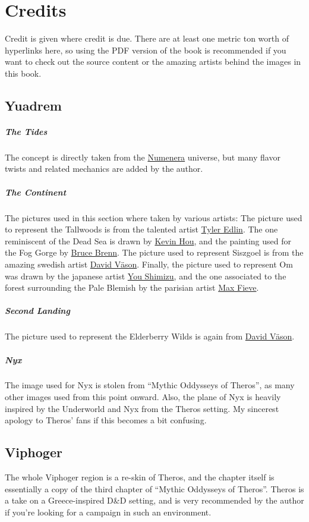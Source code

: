 \section{Credits}

Credit is given where credit is due.
There are at least one metric ton worth of hyperlinks here, so using the PDF version of the book is recommended if you want to check out the source content or the amazing artists behind the images in this book.

\subsection*{Yuadrem}
    \subparagraph{The Tides} The concept is directly taken from the \href{http://numenera.com/}{Numenera} universe, but many flavor twists and related mechanics are added by the author.

    \subparagraph{The Continent} The pictures used in this section where taken by various artists:
    The picture used to represent the Tallwoods is from the talented artist \href{https://www.artstation.com/tyleredlinart}{Tyler Edlin}.
    The one reminiscent of the Dead Sea is drawn by \href{https://www.artstation.com/knightblur}{Kevin Hou}, and the painting used for the Fog Gorge by \href{https://www.artstation.com/brucebrenn}{Bruce Brenn}.
    The picture used to represent Siszgoel is from the amazing swedish artist \href{https://www.artstation.com/davidvason}{David V\"ason}.
    Finally, the picture used to represent Om was drawn by the japanese artist \href{https://www.pixiv.net/en/users/2830609}{You Shimizu}, and the one associated to the forest surrounding the Pale Blemish by the parisian artist \href{https://www.artstation.com/maxfieve}{Max Fieve}.

    \subparagraph{Second Landing} The picture used to represent the Elderberry Wilds is again from \href{https://www.artstation.com/davidvason}{David V\"ason}.

    \subparagraph{Nyx} The image used for Nyx is stolen from ``Mythic Oddysseys of Theros'', as many other images used from this point onward.
    Also, the plane of Nyx is heavily inspired by the Underworld and Nyx from the Theros setting.
    My sincerest apology to Theros' fans if this becomes a bit confusing.

\subsection*{Viphoger}
    The whole Viphoger region is a re-skin of Theros, and the chapter itself is essentially a copy of the third chapter of ``Mythic Oddysseys of Theros''.
    Theros is a take on a Greece-inspired D\&D setting, and is very recommended by the author if you're looking for a campaign in such an environment.

